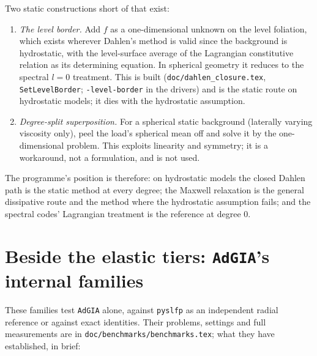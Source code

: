 \documentclass[11pt]{article}
\numberwithin{equation}{section}
\newcommand{\code}[1]{\texttt{#1}}
\begin{document}
Two static constructions short of that exist:
\begin{enumerate}[leftmargin=*,label=(\alph*)]
\item \emph{The level border.} Add $f$ as a one-dimensional unknown on
  the level foliation, which exists wherever Dahlen's method is valid
  since the background is hydrostatic, with the level-surface average of
  the Lagrangian constitutive relation as its determining equation. In
  spherical geometry it reduces to the spectral $l=0$ treatment. This is
  built (\code{doc/dahlen\_closure.tex}, \code{SetLevelBorder};
  \code{-level-border} in the drivers) and is the static route on
  hydrostatic models; it dies with the hydrostatic assumption.
\item \emph{Degree-split superposition.} For a spherical static background
  (laterally varying viscosity only), peel the load's spherical mean off
  and solve it by the one-dimensional problem. This exploits linearity and
  symmetry; it is a workaround, not a formulation, and is not used.
\end{enumerate}
The programme's position is therefore: on hydrostatic models the
closed Dahlen path is the static method at every degree; the Maxwell
relaxation is the general dissipative route and the method where the
hydrostatic assumption fails; and the spectral codes' Lagrangian
treatment is the reference at degree 0.

\section{Beside the elastic tiers: \code{AdGIA}'s internal families}
\label{sec:internal-elastic}

These families test \code{AdGIA} alone, against \code{pyslfp} as an
independent radial reference or against exact identities. Their problems,
settings and full measurements are in \code{doc/benchmarks/benchmarks.tex}; what they
have established, in brief:
\end{document}
